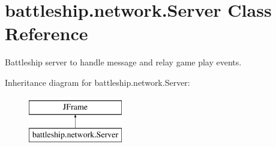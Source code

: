\hypertarget{classbattleship_1_1network_1_1Server}{}\section{battleship.\+network.\+Server Class Reference}
\label{classbattleship_1_1network_1_1Server}


Battleship server to handle message and relay game play events.  


Inheritance diagram for battleship.\+network.\+Server\+:\begin{figure}[H]
\begin{center}
\leavevmode
\includegraphics[height=2.000000cm]{classbattleship_1_1network_1_1Server}
\end{center}
\end{figure}
